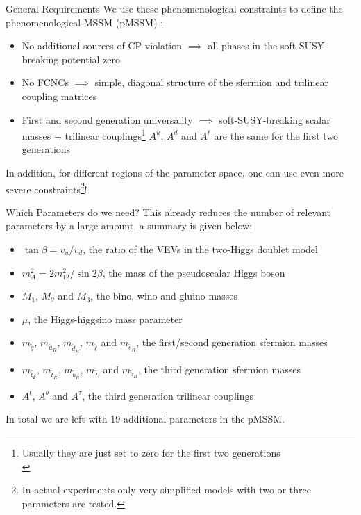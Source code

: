 \begin{frame}{General Requirements}
We use these phenomenological constraints to define the \alert{phenomenological MSSM} (pMSSM) \cite{MSSMGroup1998}:\\[1em]
\begin{itemize}
	\item  No additional sources of CP-violation $\implies$ all phases in the soft-SUSY-breaking potential  zero \\[1em]
	\item No FCNCs $\implies$ simple, diagonal structure of the sfermion and trilinear coupling matrices\\[1em]
	\item First and second generation universality $\implies$ soft-SUSY-breaking scalar masses + trilinear couplings\footnote{Usually they are just set to zero for the first two generations\\} $A^{u}$, $A^d$ and $A^\ell$  are the same for the first two generations\\[2em]
\end{itemize}
 In addition, for different regions of the parameter space, one can use even more severe constraints\footnote{In actual experiments only very simplified models with two or three parameters are tested.}!
\end{frame}

\begin{frame}{Which Parameters do we need?}
This already reduces the number of relevant parameters by a large amount, a summary is given below:\\[1em]
\begin{itemize}
	\pause
	\item $\tan\beta = v_u/v_d$, the ratio of the VEVs in the two-Higgs doublet model\\[1em]
	\pause
	\item $m_{A}^2 = 2m_{12}^2  / \operatorname{sin} 2\beta$, the mass of the pseudoscalar Higgs boson\\[1em]
	\pause
	\item $M_{1}$, $M_{2}$ and $M_{3}$, the bino, wino and gluino masses\\[1em]
	\pause
	\item $\mu$, the Higgs-higgsino mass parameter\\[1em]
	\pause
	\item $m_{\tilde{q}}$, $m_{\tilde{u}_R}$, $m_{\tilde{d}_R}$, $m_{\tilde{\ell}}$ and $m_{\tilde{e}_R}$, the first/second generation sfermion masses\\[1em]
	\pause
	\item $m_{\tilde{Q}}$, $m_{\tilde{t}_R}$, $m_{\tilde{b}_R}$, $m_{\tilde{L}}$ and $m_{\tilde{\tau}_R}$, the third generation sfermion masses\\[1em]
	\pause
	\item $A^{t}$, $A^{b}$ and $A^{\tau}$, the third generation trilinear couplings\\[1em]
\end{itemize}
In total we are left with \alert{19 additional parameters} in the pMSSM.
 \end{frame}
 
